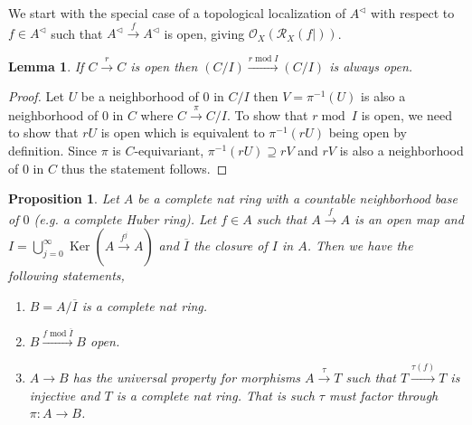 \documentclass[8pt]{article}
\numberwithin{equation}{section}
\newtheorem{proposition}{Proposition}[subsection]
\newtheorem{lemma}{Lemma}[subsection]
\DeclareMathOperator{\tmod}{mod}
\DeclareMathOperator{\Ker}{Ker}
\newcommand{\Ouv}{\mathscr{O}}
\newcommand{\cR}[0]{\mathcal{R}}
\begin{document}
We start with the special case of a topological localization of $A^\triangleleft$ with respect to $f\in A^\triangleleft$ such that $A^{\triangleleft}\stackrel{f}{\to} A^\triangleleft$ is open, giving $\Ouv_X(\cR_X(f|))$. 
\begin{lemma}
    \label{lemma_18_1}
    If $C\stackrel{r}{\to}C$ is open then $(C/I)\stackrel{r\tmod I}{\to}(C/I)$ is always open.
\end{lemma}
\begin{proof}
    Let $U$ be a neighborhood of $0$ in $C/I$ then $V = \pi^{-1}(U)$ is also a neighborhood of $0$ in $C$ where $C\stackrel{\pi}{\to}C/I$. To show that $r\tmod\:I$ is open, we need to show that $rU$ is open which is equivalent to $\pi^{-1}(rU)$ being open by definition.
    Since $\pi$ is $C$-equivariant, $\pi^{-1}(rU)\supseteq rV$ and $rV$ is also a neighborhood of $0$ in $C$ thus the statement follows.
\end{proof}
\begin{proposition}
    \label{proposition_18_1}
    Let $A$ be a complete nat ring with a countable neighborhood base of $0$ (e.g. a complete Huber ring). 
    Let $f\in A$ such that $A\stackrel{f}{\to}A$ is an open map and $I=\bigcup_{j=0}^\infty \Ker(A\stackrel{f^j}{\to}A)$ and $\overline{I}$ the closure of $I$ in $A$.
    Then we have the following statements,
    \begin{enumerate}
    \item  $B=A/\overline{I}$ is a complete nat ring.
    \item $B\stackrel{f\tmod \overline{I}}{\to}B$ open.
    \item $A\to B$ has the universal property for morphisms $A\stackrel{\tau}{\to}T$ such that $T\stackrel{\tau(f)}{\to}T$ is injective and $T$ is a complete nat ring. That is such $\tau$ must factor through $\pi:A\to B$.
    \end{enumerate}
\end{proposition}
\end{document}

